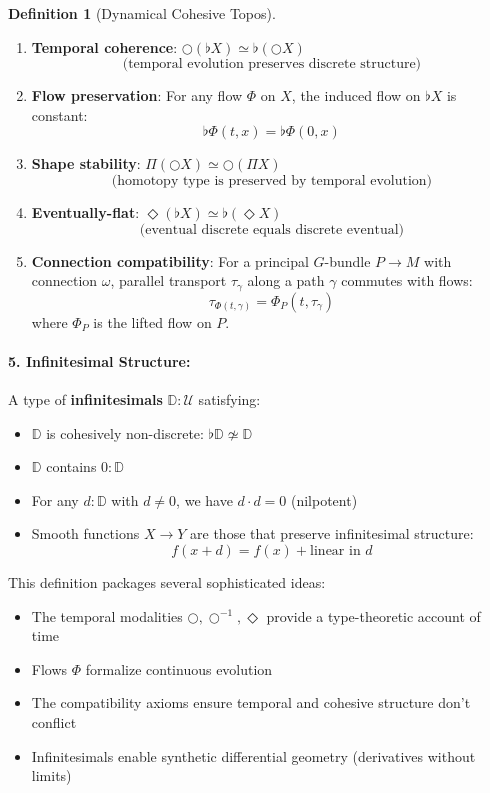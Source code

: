 \documentclass[11pt]{article}
\theoremstyle{definition}
\newtheorem{definition}[theorem]{Definition}
\begin{document}
\begin{definition}[Dynamical Cohesive Topos]
\begin{enumerate}[label=\textbf{(C\arabic*)}, leftmargin=*]
\item \textbf{Temporal coherence}: $\bigcirc(\flat X) \simeq \flat(\bigcirc X)$ 
\[
\text{(temporal evolution preserves discrete structure)}
\]

\item \textbf{Flow preservation}: For any flow $\Phi$ on $X$, the induced flow on $\flat X$ is constant:
\[
\flat\Phi(t, x) = \flat\Phi(0, x)
\]

\item \textbf{Shape stability}: $\Pi(\bigcirc X) \simeq \bigcirc(\Pi X)$
\[
\text{(homotopy type is preserved by temporal evolution)}
\]

\item \textbf{Eventually-flat}: $\Diamond(\flat X) \simeq \flat(\Diamond X)$
\[
\text{(eventual discrete equals discrete eventual)}
\]

\item \textbf{Connection compatibility}: For a principal $G$-bundle $P \to M$ with connection $\omega$, parallel transport $\tau_\gamma$ along a path $\gamma$ commutes with flows:
\[
\tau_{\Phi(t,\gamma)} = \Phi_P(t, \tau_\gamma)
\]
where $\Phi_P$ is the lifted flow on $P$.
\end{enumerate}

\paragraph{5. Infinitesimal Structure:}
A type of \textbf{infinitesimals} $\mathbb{D} : \mathcal{U}$ satisfying:
\begin{itemize}
\item $\mathbb{D}$ is cohesively non-discrete: $\flat\mathbb{D} \not\simeq \mathbb{D}$
\item $\mathbb{D}$ contains $0 : \mathbb{D}$
\item For any $d : \mathbb{D}$ with $d \neq 0$, we have $d \cdot d = 0$ (nilpotent)
\item Smooth functions $X \to Y$ are those that preserve infinitesimal structure:
\[
f(x + d) = f(x) + \text{linear in } d
\]
\end{itemize}
\end{definition}

This definition packages several sophisticated ideas:
\begin{itemize}
\item The temporal modalities $\bigcirc, \bigcirc^{-1}, \Diamond$ provide a type-theoretic account of time
\item Flows $\Phi$ formalize continuous evolution
\item The compatibility axioms ensure temporal and cohesive structure don't conflict
\item Infinitesimals enable synthetic differential geometry (derivatives without limits)
\end{itemize}
\end{document}
